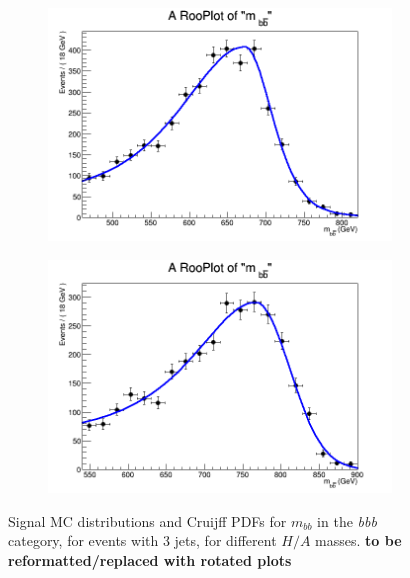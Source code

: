 \begin{figure}[phtb!]
\begin{center}
  \begin{subfigure}[$m_{A}=700$ GeV]{0.4\textwidth}\includegraphics[width=\textwidth]{FitResults/images/fitMC_bAbb700_1.png}\end{subfigure}
  \begin{subfigure}[$m_{A}=800$ GeV]{0.4\textwidth}\includegraphics[width=\textwidth]{FitResults/images/fitMC_bAbb800_1.png}\end{subfigure}
  \caption{Signal MC distributions and Cruijff PDFs for $m_{bb}$ in the {\it bbb} category, for events with 3 jets, for different $H/A$ masses. \textbf{to be reformatted/replaced with rotated plots}\label{fig:signalPDFs_3j}}
    \end{center}
\end{figure}


